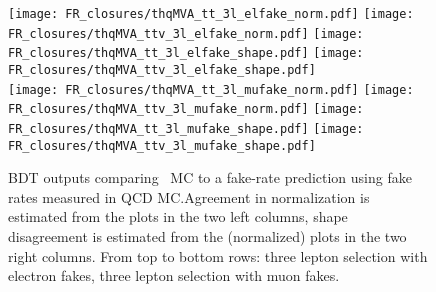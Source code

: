 \begin{figure}[htb]
 \centering
 \texttt{[image: FR\_closures/thqMVA\_tt\_3l\_elfake\_norm.pdf]} 
 \texttt{[image: FR\_closures/thqMVA\_ttv\_3l\_elfake\_norm.pdf]} 
 \texttt{[image: FR\_closures/thqMVA\_tt\_3l\_elfake\_shape.pdf]} 
 \texttt{[image: FR\_closures/thqMVA\_ttv\_3l\_elfake\_shape.pdf]} \\
 \texttt{[image: FR\_closures/thqMVA\_tt\_3l\_mufake\_norm.pdf]} 
 \texttt{[image: FR\_closures/thqMVA\_ttv\_3l\_mufake\_norm.pdf]} 
 \texttt{[image: FR\_closures/thqMVA\_tt\_3l\_mufake\_shape.pdf]} 
 \texttt{[image: FR\_closures/thqMVA\_ttv\_3l\_mufake\_shape.pdf]} 
\caption[Fake rates closure test in the $3l$ selection.]{BDT outputs comparing \ttbar\ MC to a fake-rate prediction using fake rates measured in QCD MC.\@ Agreement in normalization is estimated from the plots in the two left columns, shape disagreement is estimated from the (normalized) plots in the two right columns. From top to bottom rows: three lepton selection with electron fakes, three lepton selection with muon fakes.} 
\label{fig:frclosure_3l_elfake}
\end{figure} 
\clearpage
